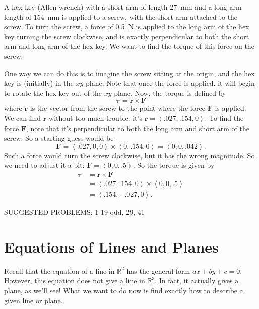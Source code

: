 \documentclass[10pt,]{book}
\theoremstyle{ptxplainnotitle}
\theoremstyle{ptxplaintitle}
\theoremstyle{ptxplainnotitle}
\theoremstyle{ptxplaintitle}
\theoremstyle{ptxplainnotitle}
\theoremstyle{ptxplaintitle}
\theoremstyle{ptxdefinitionnotitle}
\theoremstyle{ptxdefinitiontitle}
\theoremstyle{ptxdefinitionnotitle}
\theoremstyle{ptxdefinitiontitle}
\theoremstyle{ptxdefinitionnotitle}
\theoremstyle{ptxdefinitiontitle}
\theoremstyle{ptxdefinitionnotitle}
\theoremstyle{ptxdefinitiontitle}
\theoremstyle{ptxdefinitionnotitle}
\theoremstyle{ptxdefinitiontitle}
\numberwithin{equation}{section}
\newcommand{\RR}{\mathbb{R}}
\newcommand{\vv}[1]{\mathbf{#1}}
\newcommand{\dotprod}[1]{\left\langle #1 \right\rangle}
\begin{document}
\begin{example}\label{example-torque-and-hex-keys}
\hypertarget{p-851}{}%
A hex key (Allen wrench) with a short arm of length \SI{27}{\milli\meter} and a long arm length of \SI{154}{\milli\meter} is applied to a screw, with the short arm attached to the screw. To turn the screw, a force of \SI{0.5}{\newton} is applied to the long arm of the hex key turning the screw clockwise, and is exactly perpendicular to both the short arm and long arm of the hex key. We want to find the torque of this force on the screw.%
\par
\hypertarget{p-852}{}%
One way we can do this is to imagine the screw sitting at the origin, and the hex key is (initially) in the \(xy\)-plane. Note that once the force is applied, it will begin to rotate the hex key out of the \(xy\)-plane. Now, the torque is defined by%
%
\begin{equation*}
\boldsymbol{\tau} = \vv{r}\times\vv{F}
\end{equation*}
\hypertarget{p-853}{}%
where \(\vv{r}\) is the vector from the screw to the point where the force \(\vv{F}\) is applied. We can find \(\vv{r}\) without too much trouble: it's \(\vv{r} = \dotprod{.027,.154,0}\). To find the force \(\vv{F}\), note that it's perpendicular to both the long arm and short arm of the screw. So a starting guess would be%
%
\begin{equation*}
\vv{F} = \dotprod{.027,0,0}\times\dotprod{0,.154,0} = \dotprod{0,0,.042}.
\end{equation*}
\hypertarget{p-854}{}%
Such a force would turn the screw clockwise, but it has the wrong magnitude. So we need to adjust it a bit: \(\vv{F} = \dotprod{0,0,.5}\). So the torque is given by%
%
\begin{align*}
\mathbf{\tau} &= \vv{r}\times\vv{F} \\
& = \dotprod{.027,.154,0}\times\dotprod{0,0,.5} \\
& = \dotprod{.154,-.027,0}. 
\end{align*}
\end{example}
\bigbreak
\hypertarget{p-855}{}%
SUGGESTED PROBLEMS: 1-19 odd, 29, 41%
\typeout{************************************************}
\typeout{************************************************}
\section[{Equations of Lines and Planes}]{Equations of Lines and Planes}\label{section-equations-of-lines-and-planes}
\hypertarget{p-856}{}%
Recall that the equation of a line in \(\RR^{2}\) has the general form \(ax+by + c = 0\). However, this equation does not give a line in \(\RR^{3}\). In fact, it actually gives a plane, as we'll see! What we want to do now is find exactly how to describe a given line or plane.%
\typeout{************************************************}
\typeout{************************************************}
\end{document}
